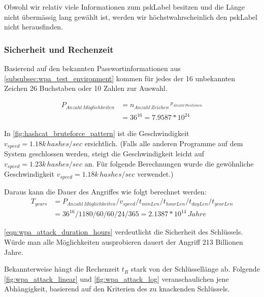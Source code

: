 Obwohl wir relativ viele Informationen zum \gls{pskLabel} besitzen und die Länge nicht übermässig lang gewählt ist, werden wir höchstwahrscheinlich den \gls{pskLabel} nicht herausfinden.


\subsubsection{Sicherheit und Rechenzeit}

Basierend auf den bekannten Passwortinformationen aus \cref{subsubsec:wpa_test_environment} kommen für jedes der 16 unbekannten Zeichen 26 Buchstaben oder 10 Zahlen zur Auswahl.

\begin{equation}
	\begin{split}
	\label{eqn:wpa_attack_key_possibelities}
	P_{Anzahl\,Möglichkeiten} &= n_{Anzahl\,Zeichen}\,^{p_{Anzahl\,Positionen}}\\
	&= 36^{16} = 7.9587 * 10^{24}
	\end{split}
\end{equation}

In \cref{fig:hashcat_bruteforce_pattern} ist die Geschwindigkeit $v_{speed} = 1.18k\,hashes/sec$ ersichtlich.
(Falls alle anderen Programme auf dem System geschlossen werden, steigt die Geschwindigkeit leicht auf $v_{speed} = 1.23k\,hashes/sec$ an.
Für folgende Berechnungen wurde die gewöhnliche Geschwindigkeit $v_{speed} = 1.18k\,hashes/sec$ verwendet.)

Daraus kann die Dauer des Angriffes wie folgt berechnet werden:
\begin{equation}
	\begin{split}
	\label{eqn:wpa_attack_duration_hours}
	T_{years} &= P_{Anzahl\,Möglichkeiten} / v_{speed} / t_{minLen} / t_{hourLen} / t_{dayLen} / t_{yearLen}\\
	&= 36^{16} / 1180 / 60 / 60 / 24 / 365 = 2.1387 * 10^{14}\,Jahre
	\end{split}
\end{equation}

\cref{eqn:wpa_attack_duration_hours} verdeutlicht die Sicherheit des Schlüssels. Würde man alle Möglichkeiten ausprobieren dauert der Angriff 213 Billionen Jahre.

Bekannterweise hängt die Rechenzeit $t_R$ stark von der Schlüssellänge ab.
Folgende \cref{fig:wpa_attack_linear} und \cref{fig:wpa_attack_log} veranschaulichen jene Abhängigkeit, basierend auf den Kriterien des zu knackenden Schlüssels.

